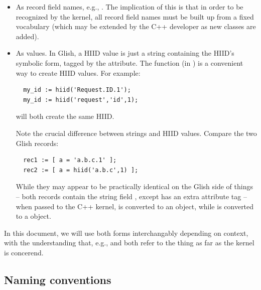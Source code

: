   \begin{itemize}
  
  \item As record field names, e.g., . The implication of
  this is that in order to be recognized by the kernel, all record field names
  must be built up from a fixed vocabulary (which may be extended by the
  C++ developer as new classes are added).

  \item As values. In Glish, a HIID value is just a string containing the
  HIID's symbolic form, tagged by the  attribute. The
   function (in ) is a convenient way to create HIID
  values. For example:

  \begin{verbatim}
  my_id := hiid('Request.ID.1');
  my_id := hiid('request','id',1);
  \end{verbatim}
  
  will both create the same HIID. 
  
  Note the crucial difference between strings and HIID values. Compare the two
  Glish records:

  \begin{verbatim}
  rec1 := [ a = 'a.b.c.1' ];
  rec2 := [ a = hiid('a.b.c',1) ];
  \end{verbatim}
  
  While they may appear to be practically identical on the Glish side of things
  -- both records contain the string field , except  has an
  extra attribute tag -- when passed to the C++ kernel,  is
  converted to an  object, while  is converted to a
   object.
  
  \end{itemize}

  In this document, we will use both forms interchangably depending on context,
  with the understanding that, e.g.,  and 
  both refer to the thing as far as the kernel is concerend.

\subsection{Naming conventions}

